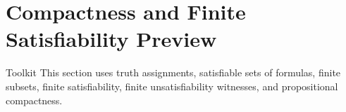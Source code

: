 \section{Compactness and Finite Satisfiability Preview}

\begin{toolkitbox}{Toolkit}
This section uses truth assignments, satisfiable sets of formulas, finite
subsets, finite satisfiability, finite unsatisfiability witnesses, and
propositional compactness.
\end{toolkitbox}











